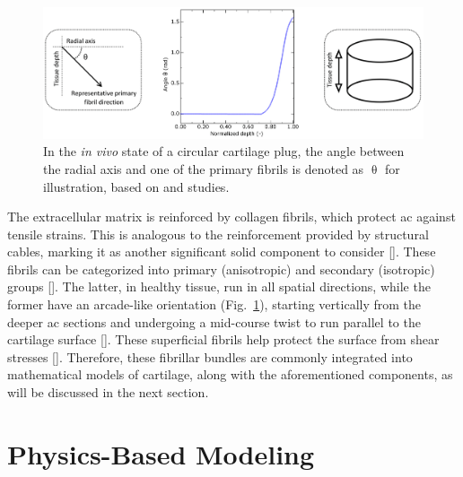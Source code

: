 \documentclass[12pt,a4paper]{report}
\begin{document}
\begin{figure}
\centering
\includegraphics[width=0.9\linewidth]{arcade.jpg}
\caption{In the \emph{in vivo} state of a circular cartilage plug, the angle between the radial axis and one of the primary fibrils is denoted as 
$\uptheta$ for illustration, based on \cite{benninghoff1925} and \cite{wilson2004a} studies.
\label{arcade}}
\end{figure}
%
The extracellular matrix is reinforced by collagen fibrils, which protect \ac{ac} against tensile strains. This is analogous to the reinforcement provided by structural cables, marking it as another significant solid component to consider [\cite{laurent2007,bielajew2020}]. These fibrils can be categorized into primary (anisotropic) and secondary (isotropic) groups [\cite{clark1985,wilson2004a}]. The latter, in healthy tissue, run in all spatial directions, while the former have an arcade-like orientation (Fig.~\ref{arcade}), starting vertically from the deeper \ac{ac} sections and undergoing a mid-course twist to run parallel to the cartilage surface [\cite{wilson2004a}]. These superficial fibrils help protect the surface from shear stresses [\cite{shirazi2008,motavalli2014}]. Therefore, these fibrillar bundles are commonly integrated into mathematical models of cartilage, along with the aforementioned components, as will be discussed in the next section.

\section{Physics-Based Modeling}
\end{document}
